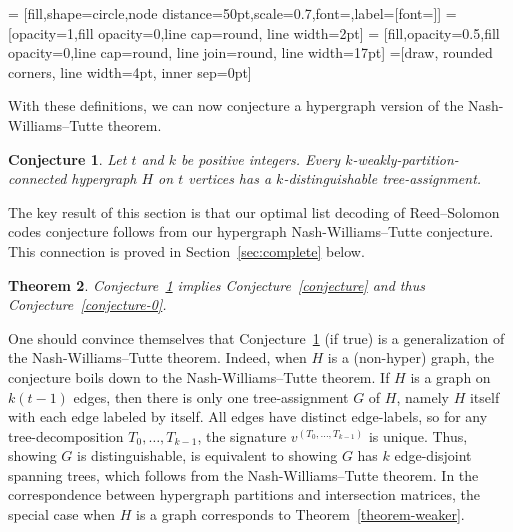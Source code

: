 \documentclass[11pt]{article}
\newtheorem{theorem}{Theorem}[section]
\newtheorem{conjecture}[theorem]{Conjecture}
\begin{document}
\usetikzlibrary{calc, positioning, fit}
 = [fill,shape=circle,node distance=50pt,scale=0.7,font=\tiny,label={[font=\tiny]}]
 = [opacity=1,fill opacity=0,line cap=round, line width=2pt]
 = [fill,opacity=0.5,fill opacity=0,line cap=round, line join=round, line width=17pt]
=[draw, rounded corners, line width=4pt, inner sep=0pt]        %




With these definitions, we can now conjecture a hypergraph version of the Nash-Williams--Tutte theorem.

\begin{conjecture}\label{conj:weak}
  Let $t$ and $k$ be positive integers.
  Every $k$-weakly-partition-connected hypergraph $H$ on $t$ vertices has a $k$-distinguishable tree-assignment.
\end{conjecture}

The key result of this section is that our optimal list decoding of Reed--Solomon codes conjecture follows from our hypergraph Nash-Williams--Tutte conjecture.
This connection is proved in Section~\ref{sec:complete} below.
\begin{theorem}
  \label{thm:complete-2}
  Conjecture~\ref{conj:weak} implies Conjecture~\ref{conjecture} and thus Conjecture~\ref{conjecture-0}.
\end{theorem}

One should convince themselves that Conjecture~\ref{conj:weak} (if true) is a generalization of the Nash-Williams--Tutte theorem.
Indeed, when $H$ is a (non-hyper) graph, the conjecture boils down to the Nash-Williams--Tutte theorem.
If $H$ is a graph on $k(t-1)$ edges, then there is only one tree-assignment $G$ of $H$, namely $H$ itself with each edge labeled by itself.
All edges have distinct edge-labels, so for any tree-decomposition $T_0,\dots,T_{k-1}$, the signature $v^{(T_0,\dots,T_{k-1})}$ is unique.
Thus, showing $G$ is distinguishable, is equivalent to showing $G$ has $k$ edge-disjoint spanning trees, which follows from the Nash-Williams--Tutte theorem.
In the correspondence between hypergraph partitions and intersection matrices, the special case when $H$ is a graph corresponds to Theorem~\ref{theorem-weaker}.
\end{document}
